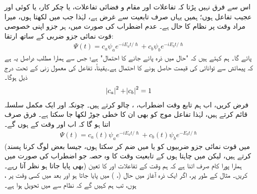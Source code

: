 اس سے فرق نہیں پڑتا کہ تفاعلات  اور  مقام و  فضائی تفاعلات،  یا چکر کار،  یا کوئی اور عجیب تفاعل ہوں؛ ہمیں یہاں صرف تابعیت    سے غرض ہے،  لہٰذا جب  میں  لکھتا ہوں،  میرا مراد وقت  پر نظام کا حال ہے۔ عدم اضطراب کی صورت میں،  ہر جزو  اپنی خصوصی قوت نمائی جزو  ضربی  کے ساتھ ارتقا:
\begin{align}
	\Psi(t)=c_a\psi_ae^{-iE_at/\hslash}+c_b\psi_be^{-iE_bt/\hslash}
\end{align}
پائے گا۔ ہم کہتے ہیں کہ "حال  میں ذرہ پائے جانے کا احتمال"   ہے؛ جس سے ہمارا   مطلب دراصل  یہ ہے کہ پیمائش سے  توانائی کی قیمت   حاصل ہونے کا احتمال  ہے۔یقیناً،  تفاعل  کی معمول زنی کے تحت درج ذیل ہوگا۔
\begin{align}
	\abs{c_a}^2+\abs{c_b}^2=1
\end{align}
 فرض کریں، اب  ہم تابع وقت اضطراب،  ،  چالو کرتے ہیں۔ چونکہ  اور  ایک مکمل سلسلہ  قائم   کرتے ہیں، لہٰذا تفاعل موج  کو بھی ان کا خطی جوڑ لکھا جا سکتا ہے۔ فرق صرف اتنا ہو گا کہ اب  اور  وقت  کے   ہوں گے۔
\begin{align}\label{مساوات_مضطرب_وقت}
	\Psi(t)=c_a(t)\psi_ae^{-iE_at/\hslash}+c_b(t)\psi_be^{-E_bt/\hslash}
\end{align}
(میں قوت نمائی  جزو  ضربیوں کو  یا  میں ضم کر سکتا ہوں، جیسا  بعض  لوگ کرنا پسند کرتے ہیں، لیکن میں چاہتا ہوں کے تابعیت وقت کا وہ حصہ جو   اضطراب کی   صورت میں بھی پایا جاتا ہو نظر آتا رہے۔)  ہمارا پورا کام صرف اتنا ہے کہ ہم وقت کے تفاعلات  اور  کا  تعین کریں۔ مثال کے طور پر،  اگر ایک ذرہ آغاز میں حال  
(، )  میں پایا جاتا ہو اور بعد میں کسی وقت  پر  ،  ہوں،  تب ہم کہیں گے کہ نظام  سے  میں  تحویل  ہوا ہے۔

